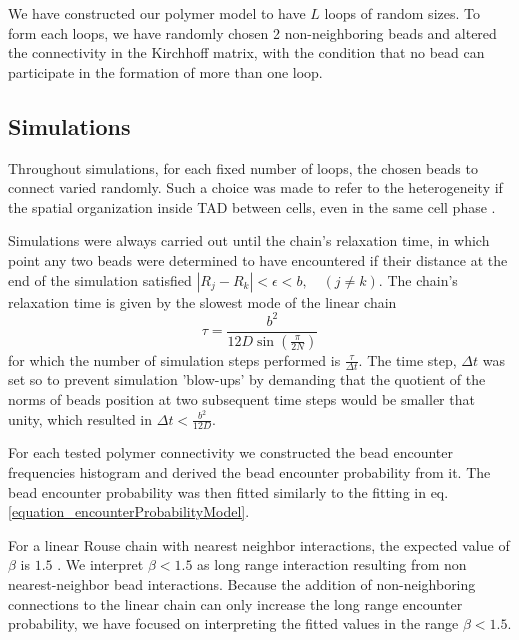 \documentclass[12pt]{paper}
\begin{document}
We have constructed our polymer model to have $L$ loops of random sizes. To form each loops, we have randomly chosen 2 non-neighboring beads and altered the connectivity in the Kirchhoff matrix, with the condition that no bead can participate in the formation of more than one loop. 

\subsection{Simulations}\label{subsection_simulations}
Throughout simulations, for each fixed number of loops, the chosen beads to connect varied randomly. Such a choice was made to refer to the heterogeneity if the spatial organization inside TAD between cells, even in the same cell phase \cite{Nora2012}.

Simulations were always carried out until the chain's relaxation time, in which point any two beads were determined to have encountered if their distance at the end of the simulation satisfied $|R_j-R_k|<\epsilon<b,\quad  (j\ne k)$. 
The chain's relaxation time is given by the slowest mode of the linear chain 
\begin{equation*}
\tau =\frac{b^2}{12D\sin(\frac{\pi}{2N})} 
\end{equation*}  
for which the number of simulation steps performed is $\frac{\tau}{\Delta t} $. The time step, $\Delta t$ was set so to prevent simulation 'blow-ups' by demanding that the quotient of the norms of beads position at two subsequent time steps would be smaller that unity, which resulted in $\Delta t < \frac{b^2}{12D}$. 

For each tested polymer connectivity we constructed the bead encounter frequencies histogram and derived the bead encounter probability from it. The bead encounter probability was then fitted similarly to the fitting in eq. \ref{equation_encounterProbabilityModel}. 

For a linear Rouse chain with nearest neighbor interactions, the expected value of $\beta$ is $1.5$ \cite{doi1986theory}. We interpret $\beta<1.5$ as long range interaction resulting from non nearest-neighbor bead interactions.
Because the addition of non-neighboring connections to the linear chain can only increase the long range encounter probability, we have focused on interpreting the fitted values in the range $\beta<1.5$. 
\end{document}
